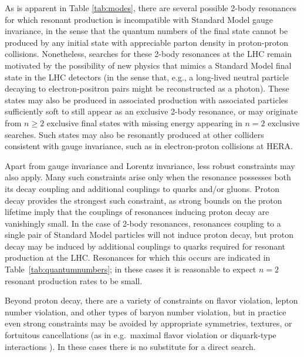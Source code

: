 As is apparent in Table \ref{tab:modes}, there are several possible 2-body resonances for which resonant production is incompatible with Standard Model gauge invariance, in the sense that the quantum numbers of the final state cannot be produced by any initial state with appreciable parton density in proton-proton collisions. Nonetheless, searches for these 2-body resonances at the LHC remain motivated by the possibility of new physics that mimics a Standard Model final state in the LHC detectors (in the sense that, e.g., a long-lived neutral particle decaying to electron-positron pairs might be reconstructed as a photon). These states may also be produced in associated production with associated particles sufficiently soft to still appear as an exclusive 2-body resonance, or may originate from $n \geq 2$ exclusive final states with missing energy appearing in $n=2$ exclusive searches. Such states may also be resonantly produced at other colliders consistent with gauge invariance, such as in electron-proton collisions at HERA.

Apart from gauge invariance and Lorentz invariance, less robust constraints may also apply. Many such constraints arise only when the resonance possesses both its decay coupling and additional couplings to quarks and/or gluons. Proton decay provides the strongest such constraint, as strong bounds on the proton lifetime imply that the couplings of resonances inducing proton decay are vanishingly small. In the case of 2-body resonances, resonances coupling to a single pair of Standard Model particles will not induce proton decay, but proton decay may be induced by additional couplings to quarks required for resonant production at the LHC. Resonances for which this occurs are indicated in Table~\ref{tab:quantumnumbers}; in these cases it is reasonable to expect $n=2$ resonant production rates to be small.

Beyond proton decay, there are a variety of constraints on flavor violation, lepton number violation, and other types of baryon number violation, but in practice even strong constraints may be avoided by appropriate symmetries, textures, or fortuitous cancellations (as in e.g.~maximal flavor violation \cite{BarShalom:2007pw} or diquark-type interactions \cite{Giudice:2011ak}). In these cases there is no substitute for a direct search. 


